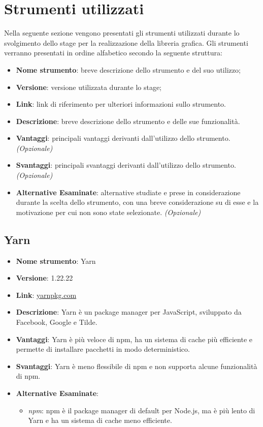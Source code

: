 \section{Strumenti utilizzati}
Nella seguente sezione vengono presentati gli strumenti utilizzati durante lo svolgimento dello stage per la realizzazione della libreria grafica.
Gli strumenti verranno presentati in ordine alfabetico secondo la seguente struttura:
\begin{itemize}
    \item \textbf{Nome strumento}: breve descrizione dello strumento e del suo utilizzo;
    \item \textbf{Versione}: versione utilizzata durante lo stage;
    \item \textbf{Link}: link di riferimento per ulteriori informazioni sullo strumento.
    \item \textbf{Descrizione}: breve descrizione dello strumento e delle sue funzionalità.
    \item \textbf{Vantaggi}: principali vantaggi derivanti dall'utilizzo dello strumento. \textit{(Opzionale)}
    \item \textbf{Svantaggi}: principali svantaggi derivanti dall'utilizzo dello strumento. \textit{(Opzionale)}
    \item \textbf{Alternative Esaminate}: alternative studiate e prese in considerazione durante la scelta dello strumento, con una breve considerazione
          su di esse e la motivazione per cui non sono state selezionate. \textit{(Opzionale)}
\end{itemize}

\subsection{Yarn}
\begin{itemize}
    \item \textbf{Nome strumento}: Yarn
    \item \textbf{Versione}: 1.22.22
    \item \textbf{Link}: \href{https://yarnpkg.com/}{yarnpkg.com}
    \item \textbf{Descrizione}: Yarn è un package manager per JavaScript, sviluppato da Facebook, Google e Tilde.
    \item \textbf{Vantaggi}: Yarn è più veloce di npm, ha un sistema di cache più efficiente e permette di installare pacchetti in modo deterministico.
    \item \textbf{Svantaggi}: Yarn è meno flessibile di npm e non supporta alcune funzionalità di npm.
    \item \textbf{Alternative Esaminate}:
          \begin{itemize}
              \item \textit{npm}: npm è il package manager di default per Node.js, ma è più lento di Yarn e ha un sistema di cache meno efficiente.
          \end{itemize}
\end{itemize}

